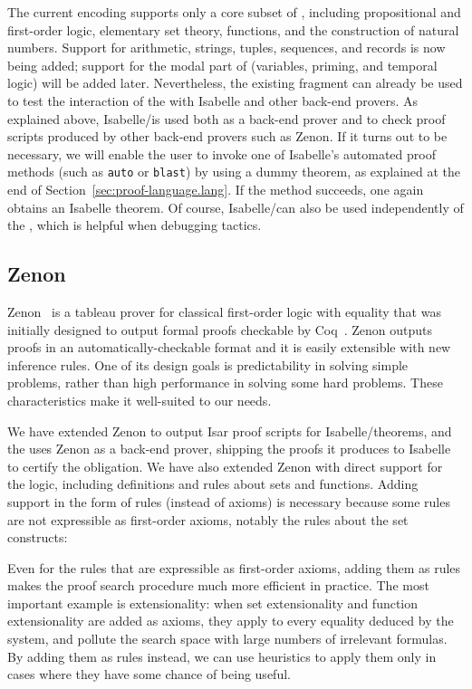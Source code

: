 \documentclass[a4paper]{easychair}
\begin{document}
The current encoding supports only a core subset of \tlatwo, including
propositional and first-order logic, elementary set theory, functions,
and the construction of natural numbers.  Support for arithmetic,
strings, tuples, sequences, and records is now being added; support
for the modal part of \tlatwo{} (variables, priming, and temporal
logic) will be added later.  Nevertheless, the existing fragment can
already be used to test the interaction of the \PM with Isabelle and
other back-end provers.  As explained above, Isabelle/\tlaplus is used
both as a back-end prover and to check proof scripts produced by other
back-end provers such as Zenon.  If it turns out to be necessary, we
will enable the user to invoke one of Isabelle's automated proof
methods (such as \texttt{auto} or \texttt{blast}) by using a dummy
theorem, as explained at the end of
Section~\ref{sec:proof-language.lang}.  If the method succeeds, one
again obtains an Isabelle theorem.  Of course,
Isabelle/\tlaplus can also be used independently of the \PM, which is
helpful when debugging tactics.

\subsection{Zenon}
\label{sec:backend.zenon}

Zenon~\cite{bonichon07lpar} is a tableau prover for classical
first-order logic with equality that was initially designed to output
formal proofs checkable by Coq~\cite{coq}.
Zenon outputs proofs in an automatically-checkable format and it is
easily extensible with new inference rules.  One of its design goals
is predictability in solving simple problems, rather than high
performance in solving some hard problems.  These characteristics make
it well-suited to our needs.

We have extended Zenon to output Isar proof scripts for
Isabelle/\tlaplus theorems, and the \PM uses Zenon as a back-end
prover, shipping the proofs it produces to Isabelle to certify the
obligation.  We have also extended Zenon with direct support for the
\tlatwo logic, including definitions and rules about sets and
functions.  Adding support in the form of rules (instead of axioms) is
necessary because some rules are not expressible as first-order
axioms, notably the rules about the set constructs:

Even for the rules that are expressible as first-order axioms, adding
them as rules makes the proof search procedure much more efficient in
practice.  The most important example is extensionality: when set
extensionality and function extensionality are added as axioms, they
apply to every equality deduced by the system, and pollute the search
space with large numbers of irrelevant formulas.  By adding them as
rules instead, we can use heuristics to apply them only in cases where
they have some chance of being useful.
\end{document}
